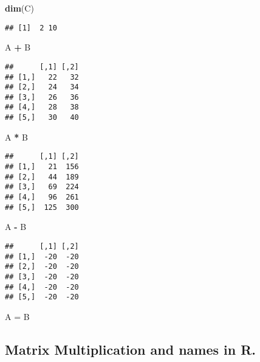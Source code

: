 \documentclass[
]{article}
\newenvironment{Shaded}{\begin{snugshade}}{\end{snugshade}}
\newcommand{\FunctionTok}[1]{\textcolor[rgb]{0.13,0.29,0.53}{\textbf{#1}}}
\newcommand{\NormalTok}[1]{#1}
\newcommand{\OtherTok}[1]{\textcolor[rgb]{0.56,0.35,0.01}{#1}}
\newcommand{\SpecialCharTok}[1]{\textcolor[rgb]{0.81,0.36,0.00}{\textbf{#1}}}
\begin{document}
\begin{Shaded}
\begin{Highlighting}[]
\FunctionTok{dim}\NormalTok{(C)}
\end{Highlighting}
\end{Shaded}

\begin{verbatim}
## [1]  2 10
\end{verbatim}

\begin{Shaded}
\begin{Highlighting}[]
\NormalTok{A }\SpecialCharTok{+}\NormalTok{ B}
\end{Highlighting}
\end{Shaded}

\begin{verbatim}
##      [,1] [,2]
## [1,]   22   32
## [2,]   24   34
## [3,]   26   36
## [4,]   28   38
## [5,]   30   40
\end{verbatim}

\begin{Shaded}
\begin{Highlighting}[]
\NormalTok{A }\SpecialCharTok{*}\NormalTok{ B}
\end{Highlighting}
\end{Shaded}

\begin{verbatim}
##      [,1] [,2]
## [1,]   21  156
## [2,]   44  189
## [3,]   69  224
## [4,]   96  261
## [5,]  125  300
\end{verbatim}

\begin{Shaded}
\begin{Highlighting}[]
\NormalTok{A }\SpecialCharTok{{-}}\NormalTok{ B}
\end{Highlighting}
\end{Shaded}

\begin{verbatim}
##      [,1] [,2]
## [1,]  -20  -20
## [2,]  -20  -20
## [3,]  -20  -20
## [4,]  -20  -20
## [5,]  -20  -20
\end{verbatim}

\begin{Shaded}
\begin{Highlighting}[]
\NormalTok{A }\OtherTok{=}\NormalTok{ B}
\end{Highlighting}
\end{Shaded}

\subsection{Matrix Multiplication and names in
R.}\label{matrix-multiplication-and-names-in-r.}
\end{document}

